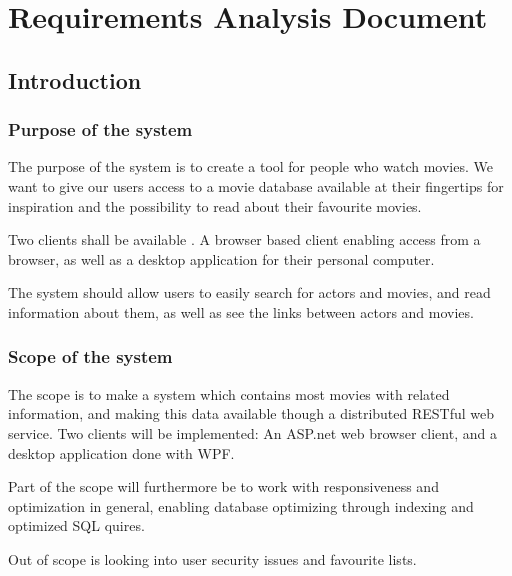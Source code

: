 \chapter{Requirements Analysis Document}

\section{Introduction}
\label{sec:introduction}



\subsection{Purpose of the system}

The purpose of the system is to create a tool for people who watch movies. We want to give our users access to a movie database available at their fingertips for inspiration and the possibility to read about their favourite movies.

Two clients shall be available . A browser based client enabling access from a browser, as well as a desktop application for their personal computer.  

The system should allow users to easily search for actors and movies, and read information about them, as well as see the links between actors and movies.




\subsection{Scope of the system}

The scope is to make a system which contains most movies with related information, and making this data available though a distributed RESTful web service. Two clients will be implemented: An ASP.net web browser client, and a desktop application done with WPF.

Part of the scope will furthermore be to work with responsiveness and optimization in general, enabling database optimizing through indexing and optimized SQL quires.


Out of scope is looking into user security issues and favourite lists.

